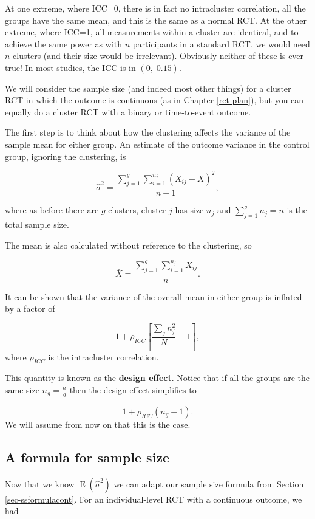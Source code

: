 \documentclass[
  openany]{book}
\theoremstyle{definition}
\theoremstyle{definition}
\theoremstyle{definition}
\theoremstyle{definition}
\theoremstyle{remark}
\begin{document}
At one extreme, where ICC=0, there is in fact no intracluster correlation, all the groups have the same mean, and this is the same as a normal RCT. At the other extreme, where ICC=1, all measurements within a cluster are identical, and to achieve the same power as with \(n\) participants in a standard RCT, we would need \(n\) clusters (and their size would be irrelevant). Obviously neither of these is ever true! In most studies, the ICC is in \(\left(0,\;0.15\right)\).

We will consider the sample size (and indeed most other things) for a cluster RCT in which the outcome is continuous (as in Chapter \ref{rct-plan}), but you can equally do a cluster RCT with a binary or time-to-event outcome.

The first step is to think about how the clustering affects the variance of the sample mean for either group. An estimate of the outcome variance in the control group, ignoring the clustering, is

\begin{equation}
\hat{\sigma}^2 = \frac{\sum\limits_{j=1}^g\sum\limits_{i=1}^{n_j}\left(X_{ij} - \bar{X}\right)^2}{n-1},
\label{eq:varcrt1}
\end{equation}

where as before there are \(g\) clusters, cluster \(j\) has size \(n_j\) and \(\sum\limits_{j=1}^gn_j=n\) is the total sample size.

The mean is also calculated without reference to the clustering, so

\[\bar{X} =  \frac{\sum\limits_{j=1}^g\sum\limits_{i=1}^{n_j}X_{ij}}{n}.\]

It can be shown that the variance of the overall mean in either group is inflated by a factor of

\[1 + \rho_{ICC}\left[ \frac{\sum\limits_j n_j^2}{N} - 1 \right], \]
where \(\rho_{ICC}\) is the intracluster correlation.

This quantity is known as the \textbf{design effect}. Notice that if all the groups are the same size \(n_g = \frac{n}{g}\) then the design effect simplifies to

\[1 + \rho_{ICC}\left(n_g - 1\right).\]
We will assume from now on that this is the case.

\subsection{A formula for sample size}\label{ss-crt}

Now that we know \(\operatorname{E}\left(\hat{\sigma}^2\right)\) we can adapt our sample size formula from Section \ref{sec-ssformulacont}. For an individual-level RCT with a continuous outcome, we had
\end{document}

